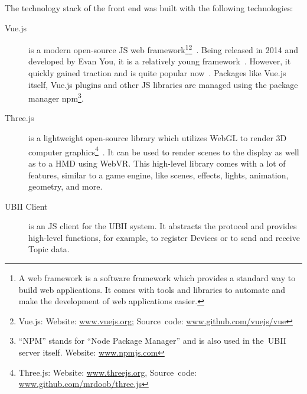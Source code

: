 The technology stack of the front end was built with the following technologies:
\begin{description}
	 
	\item[Vue.js] is a modern open-source \acrlong{JS} web framework\footnote{A web framework is a software framework which provides a standard way to build web applications. It comes with tools and libraries to automate and make the development of web applications easier.}\footnote{Vue.js: Website: \href{https://vuejs.org/}{www.vuejs.org}; Source~code: \href{https://github.com/vuejs/vue}{www.github.com/vuejs/vue}}~\cite{You.2019}. Being released in 2014 and developed by Evan You, it is a relatively young framework~\cite[17]{Koetsier.2016}. However, it quickly gained traction and is quite popular now~\cite[12\psq]{Koetsier.2016}.
  Packages like Vue.js itself, Vue.js plugins and other \acrlong{JS} libraries are managed using the package manager npm\footnote{\enquote{NPM} stands for \enquote{Node Package Manager} and is also used in the~\gls{UBII} server itself. Website: \href{https://www.npmjs.com/}{www.npmjs.com}}.
  
	\item[Three.js] is a lightweight open-source library which utilizes WebGL to render \gls{3D} computer graphics\footnote{Three.js: Website: \href{https://threejs.org/}{www.threejs.org}, Source~code: \href{https://github.com/mrdoob/three.js/}{www.github.com/mrdoob/three.js}}~\cite{Cabello.2019}. It can be used to render scenes to the display as well as to a \gls{HMD} using WebVR. This high-level library comes with a lot of features, similar to a game engine, like scenes, effects, lights, animation, geometry, and more.
	 
	\item[UBII Client] is an \acrlong{JS} client for the \gls{UBII} system. It abstracts the protocol and provides high-level functions, for example, to register Devices or to send and receive Topic data.
\end{description}

